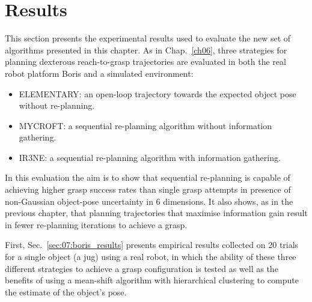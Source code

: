 %
%

\section{Results}\label{sec:ch07:results}

This section presents the experimental results used to evaluate the new set of algorithms presented in this chapter. As in Chap.~\ref{ch06}, three strategies for planning dexterous reach-to-grasp trajectories are evaluated in both the real robot platform Boris and a simulated environment:
\begin{itemize}
\item ELEMENTARY: an open-loop trajectory towards the expected object pose without re-planning.
\item MYCROFT: a sequential re-planning algorithm without information gathering. 
\item IR3NE: a sequential re-planning algorithm with information gathering. 
\end{itemize}

In this evaluation the aim is to show that sequential re-planning is capable of achieving higher grasp success rates than single grasp attempts in presence of non-Gaussian object-pose uncertainty in 6 dimensions. It also shows, as in the previous chapter, that planning trajectories that maximise information gain result in fewer re-planning iterations to achieve a grasp. 

First, Sec.~\ref{sec:07:boris_results} presents empirical results collected on 20 trials for a single object (a jug) using a real robot, in which the ability of these three different strategies to achieve a grasp configuration is tested as well as the benefits of using a mean-shift algorithm with hierarchical clustering to compute the estimate of the object's pose. 

